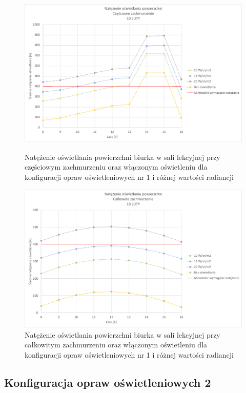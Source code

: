 \documentclass[a4paper,12pt]{article}
\begin{document}
	\begin{figure}[!ht]
		\centering
		\includegraphics[scale=0.8]{Wykresy/oswietlenie_1_czesciowe_zachmurzenie.pdf}
		\caption{Natężenie oświetlania powierzchni biurka w sali lekcyjnej przy częściowym zachmurzeniu  oraz włączonym oświetleniu dla konfiguracji opraw oświetleniowych nr 1 i różnej wartości radiancji}
		\label{oswietlenie_1_czesciowe_zachmurzenie}
	\vspace{3cm}
		\includegraphics[scale=0.8]{Wykresy/oswietlenie_1_calkowite_zachmurzenie.pdf}
		\caption{Natężenie oświetlania powierzchni biurka w sali lekcyjnej przy całkowitym zachmurzeniu  oraz włączonym oświetleniu dla konfiguracji opraw oświetleniowych nr 1 i różnej wartości radiancji}
		\label{oswietlenie_1_calkowite_zachmurzenie}
	\end{figure}

	\subsection{Konfiguracja opraw oświetleniowych 2}
	\label{sec:oswietlenie_2}
	
\end{document}
